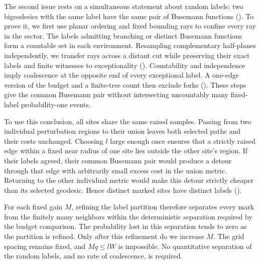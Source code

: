 The second issue rests on a simultaneous statement about random labels:
two bigeodesics with the same label have the same pair of Busemann
functions (). To prove it, we first use planar
ordering and fixed bounding rays to confine every ray in the sector.
The labels admitting branching or distinct Busemann functions form a
countable set in each environment. Resampling complementary half-planes
independently, we transfer rays across a distant cut while preserving
their exact labels and finite witnesses to exceptionality
(). Countability and independence imply
coalescence at the opposite end of every exceptional label.
A one-edge version of the budget and a finite-tree count then exclude forks
(). These steps give the
common Busemann pair without intersecting uncountably many fixed-label
probability-one events.

To use this conclusion, all sites share the same raised samples.
Passing from two individual perturbation regions to their union leaves
both selected paths and their costs unchanged. Choosing \(l\) large
enough once ensures that a strictly raised edge within a fixed near
radius of one site lies outside the other site's region. If their labels
agreed, their common Busemann pair would produce
a detour through that edge with arbitrarily small excess cost in the
union metric. Returning to the other individual metric would make this
detour strictly cheaper than its selected geodesic. Hence distinct
marked sites have distinct labels ().

For each fixed gain \(M\), refining the label partition therefore
separates every mark from the finitely many neighbors within the
deterministic separation required by the budget comparison. The probability lost in
this separation tends to zero as the partition is refined. Only after
this refinement do we increase \(M\). The grid spacing remains fixed,
and \(Mq\le lW\) is impossible. No quantitative separation of the
random labels, and no rate of coalescence, is required.
